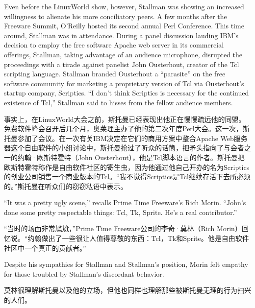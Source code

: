 \ifdefined\eng
Even before the LinuxWorld show, however, Stallman was showing an increased willingness to alienate his more conciliatory peers. A few months after the Freeware Summit, O'Reilly hosted its second annual Perl Conference. This time around, Stallman was in attendance. During a panel discussion lauding IBM's decision to employ the free software Apache web server in its commercial offerings, Stallman, taking advantage of an audience microphone, disrupted the proceedings with a tirade against panelist John Ousterhout, creator of the Tcl scripting language. Stallman branded Ousterhout a ``parasite'' on the free software community for marketing a proprietary version of Tcl via Ousterhout's startup company, Scriptics. ``I don't think Scriptics is necessary for the continued existence of Tcl,'' Stallman said to hisses from the fellow audience members.
\fi

\ifdefined\chs
事实上，在LinuxWorld大会之前，斯托曼已经表现出他正在慢慢疏远他的同盟。免费软件峰会召开后几个月，奥莱理主办了他的第二次年度Perl大会。这一次，斯托曼参加了会议。在一次有关IBM决定在它们的商用方案中整合Apache Web服务器这个自由软件的小组讨论中，斯托曼抢过了听众的话筒，把矛头指向了与会者之一的约翰·欧斯特霍特（John Ousterhout），他是Tcl脚本语言的作者。斯托曼把欧斯特霍特称作是自由软件社区的寄生虫，因为他通过他自己开办的名为Scriptics的创业公司销售一个商业版本的Tcl。``我不觉得Scriptics是Tcl继续存活下去所必须的。''斯托曼在听众们的窃窃私语中表示。
\fi

\ifdefined\eng
``It was a pretty ugly scene,'' recalls Prime Time Freeware's Rich Morin. ``John's done some pretty respectable things: Tcl, Tk, Sprite. He's a real contributor.''
\fi

\ifdefined\chs
``当时的场面非常尴尬，''Prime Time Freeware公司的李奇·莫林（Rich Morin）回忆说。``约翰做出了一些很让人值得尊敬的东西：Tcl，Tk和Sprite。他是自由软件社区中一个真正的贡献者。''
\fi

\ifdefined\eng
Despite his sympathies for Stallman and Stallman's position, Morin felt empathy for those troubled by Stallman's discordant behavior.
\fi

\ifdefined\chs
莫林很理解斯托曼以及他的立场，但他也同样也理解那些被斯托曼无理的行为扫兴的人们。
\fi

